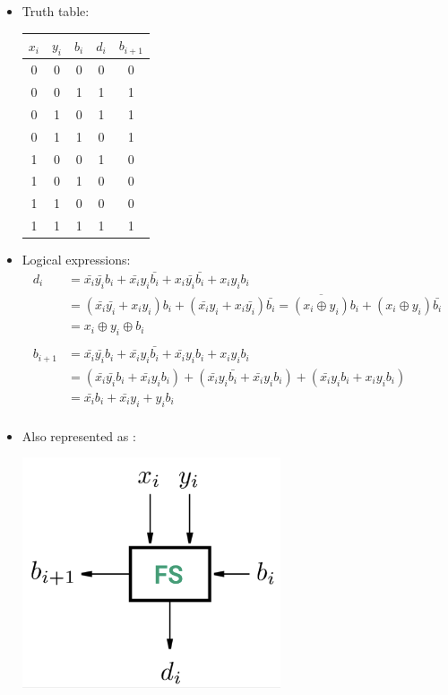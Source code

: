 \documentclass[12pt,openany, tikz,border=10pt]{book}
\begin{document}
\begin{itemize}

\item[] Truth table: \newline \vspace*{10px}
\begin{tabular}{ccc|cc}
\hline
$x_i$ & $y_i$ & $b_i$ & $d_i$ & $b_{i+1}$ \\
\hline
0 & 0 & 0 & 0 & 0 \\
0 & 0 & 1 & 1 & 1 \\
0 & 1 & 0 & 1 & 1 \\
0 & 1 & 1 & 0 & 1 \\
1 & 0 & 0 & 1 & 0 \\
1 & 0 & 1 & 0 & 0 \\
1 & 1 & 0 & 0 & 0 \\
1 & 1 & 1 & 1 & 1 \\
\hline
\end{tabular}



\item[]Logical expressions:
\begin{align*}
    d_i &= \bar{x_i}\bar{y_i} b_i + \bar{x_i} y_i \bar{b_i} + x_i \bar{y_i} \bar{b_i} + x_i y_i b_i \\
        &= (\bar{x_i} \bar{y_i} + x_i y_i) b_i + (\bar{x_i} y_i + x_i \bar{y_i}) \bar{b_i} = \overline{(x_i \oplus y_i)} b_i + (x_i \oplus y_i) \bar{b_i} \\
        &= x_i \oplus y_i \oplus b_i \\
    \\
    b_{i+1} &= \bar{x_i} \bar{y_i} b_i +\bar{x_i} y_i \bar{b_i} + \bar{x_i} y_i b_i + x_i y_i b_i \\
        &= (\bar{x_i} \bar{y_i} b_i + \bar{x_i} y_i b_i) + (\bar{x_i} y_i \bar{b_i} + \bar{x_i} y_i b_i) + (\bar{x_i}y_ib_i + x_iy_ib_i) \\
        &= \bar{x_i} b_i + \bar{x_i} y_i + y_i b_i \\
    \end{align*}

\item[] Also represented as : 
\begin{center}
    \begin{minipage}[c]{0.60\textwidth} %
        \centering
        \includegraphics[width=0.60\textwidth]{circuits/8.2.4.png} %
    \end{minipage}
  

\end{center}
\end{itemize}
\end{document}
